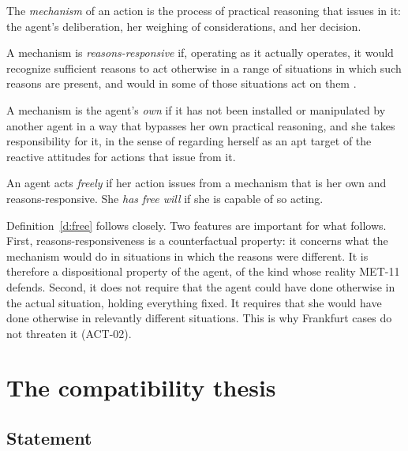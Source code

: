 \documentclass{situationist-preprint}
\begin{document}
\begin{definition}\label{d:mech}
The \emph{mechanism} of an action is the process of practical reasoning that issues in it: the agent's deliberation, her weighing of considerations, and her decision.
\end{definition}

\begin{definition}\label{d:rr}
A mechanism is \emph{reasons-responsive} if, operating as it actually operates, it would recognize sufficient reasons to act otherwise in a range of situations in which such reasons are present, and would in some of those situations act on them \citep{FischerRavizza1998}.
\end{definition}

\begin{definition}\label{d:own}
A mechanism is the agent's \emph{own} if it has not been installed or manipulated by another agent in a way that bypasses her own practical reasoning, and she takes responsibility for it, in the sense of regarding herself as an apt target of the reactive attitudes for actions that issue from it.
\end{definition}

\begin{definition}\label{d:free}
An agent acts \emph{freely} if her action issues from a mechanism that is her own and reasons-responsive. She \emph{has free will} if she is capable of so acting.
\end{definition}

Definition~\ref{d:free} follows \citet{FischerRavizza1998} closely. Two features are important for what follows. First, reasons-responsiveness is a counterfactual property: it concerns what the mechanism would do in situations in which the reasons were different. It is therefore a dispositional property of the agent, of the kind whose reality MET-11 defends. Second, it does not require that the agent could have done otherwise in the actual situation, holding everything fixed. It requires that she would have done otherwise in relevantly different situations. This is why Frankfurt cases do not threaten it (ACT-02).

\section{The compatibility thesis}

\subsection{Statement}
\end{document}

